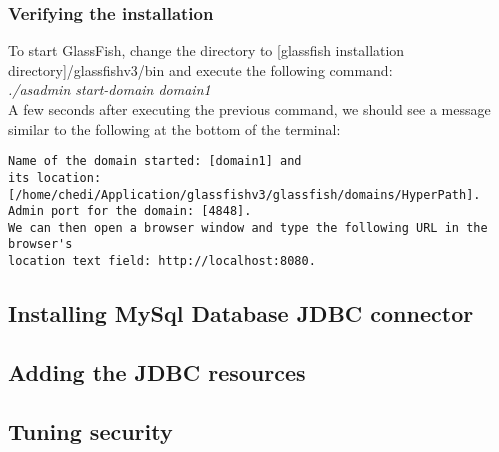 \subsubsection{Verifying the installation}
To start GlassFish, change the directory to [glassfish installation directory]/glassfishv3/bin and execute the following command: \\
\emph{./asadmin start-domain domain1}\\

A few seconds after executing the previous command, we should see a message similar to the following at the bottom of the terminal: \\
\begin{verbatim}
Name of the domain started: [domain1] and
its location: [/home/chedi/Application/glassfishv3/glassfish/domains/HyperPath].
Admin port for the domain: [4848].
We can then open a browser window and type the following URL in the browser's
location text field: http://localhost:8080.
\end{verbatim}


\subsection{Installing MySql Database JDBC connector}
\subsection{Adding the JDBC resources}
\subsection{Tuning security}
